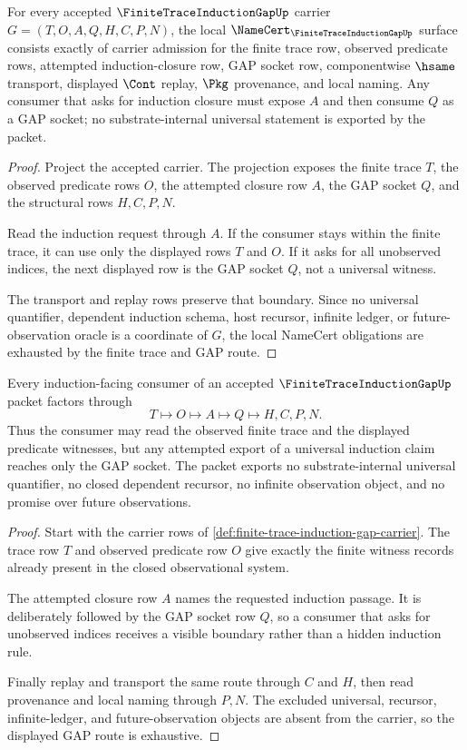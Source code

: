 \begin{theorem}
\label{thm:finite-trace-induction-gap-namecert-obligations}
For every accepted $\FiniteTraceInductionGapUp$ carrier $G=(T,O,A,Q,H,C,P,N)$, the local $\NameCert_{\FiniteTraceInductionGapUp}$ surface consists exactly of carrier admission for the finite trace row, observed predicate rows, attempted induction-closure row, GAP socket row, componentwise $\hsame$ transport, displayed $\Cont$ replay, $\Pkg$ provenance, and local naming. Any consumer that asks for induction closure must expose $A$ and then consume $Q$ as a GAP socket; no substrate-internal universal statement is exported by the packet.
\end{theorem}
\begin{proof}
Project the accepted carrier. The projection exposes the finite trace $T$, the observed predicate rows $O$, the attempted closure row $A$, the GAP socket $Q$, and the structural rows $H,C,P,N$.

Read the induction request through $A$. If the consumer stays within the finite trace, it can use only the displayed rows $T$ and $O$. If it asks for all unobserved indices, the next displayed row is the GAP socket $Q$, not a universal witness.

The transport and replay rows preserve that boundary. Since no universal quantifier, dependent induction schema, host recursor, infinite ledger, or future-observation oracle is a coordinate of $G$, the local NameCert obligations are exhausted by the finite trace and GAP route.
\end{proof}

\begin{theorem}
\label{thm:finite-trace-induction-gap-nonescape}
Every induction-facing consumer of an accepted $\FiniteTraceInductionGapUp$ packet factors through
$$
T \longmapsto O \longmapsto A \longmapsto Q \longmapsto H,C,P,N .
$$
Thus the consumer may read the observed finite trace and the displayed predicate witnesses, but any attempted export of a universal induction claim reaches only the GAP socket. The packet exports no substrate-internal universal quantifier, no closed dependent recursor, no infinite observation object, and no promise over future observations.
\end{theorem}
\begin{proof}
Start with the carrier rows of \autoref{def:finite-trace-induction-gap-carrier}. The trace row $T$ and observed predicate row $O$ give exactly the finite witness records already present in the closed observational system.

The attempted closure row $A$ names the requested induction passage. It is deliberately followed by the GAP socket row $Q$, so a consumer that asks for unobserved indices receives a visible boundary rather than a hidden induction rule.

Finally replay and transport the same route through $C$ and $H$, then read provenance and local naming through $P,N$. The excluded universal, recursor, infinite-ledger, and future-observation objects are absent from the carrier, so the displayed GAP route is exhaustive.
\end{proof}

